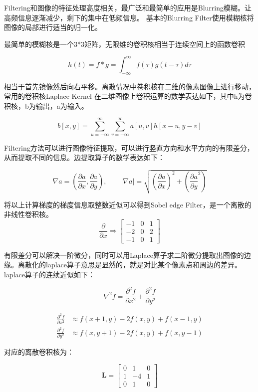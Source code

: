 Filtering和图像的特征处理高度相关，最广泛和最简单的应用是Blurring模糊。让高频信息逐渐减少，剩下的集中在低频信息。
基本的Blurring Filter使用模糊核将图像的局部进行适当的归一化。

最简单的模糊核是一个3*3矩阵，无限维的卷积核相当于连续空间上的函数卷积

\[
h(t) = f * g = \int_{-\infty}^{\infty} f(\tau)g(t - \tau) d\tau
\]

相当于首先镜像然后向右平移。离散情况中卷积核在二维的像素图像上进行移动，常用的卷积核Laplace Kernel
在二维图像上卷积运算的数学表达如下，其中h为卷积核，b为输出，a为输入。

\[
b[x, y] = \sum_{u = -\infty}^{\infty}\sum_{v = -\infty}^{\infty}a[u,v]h[x - u,y - v]  
\]

Filtering方法可以进行图像特征提取，可以进行竖直方向和水平方向的有限差分，从而提取不同的信息。边提取算子的数学表达如下：

\[
\nabla a  = (\frac{\partial a}{\partial x}, \frac{\partial a}{\partial y}) , \qquad |\nabla a| = \sqrt{(\frac{\partial a}{\partial x})^2 + (\frac{\partial a}{\partial y}^2)}
\]

将以上计算梯度的梯度信息取整数近似可以得到Sobel edge Filter，是一个离散的非线性卷积核。
\[
\frac{\partial}{\partial x} \Rightarrow
\begin{bmatrix}
    -1 & 0 & 1 \\
    -2 & 0 & 2 \\
    -1 & 0 & 1
\end{bmatrix}
\]

有限差分可以解决一阶微分，同时可以用Laplace算子求二阶微分提取出图像的边缘。离散化的laplace算子意思是显然的，就是对比某个像素点和周边的差异。
laplace算子的连续近似如下：

\[
\nabla^2 f = \frac{\partial^2 f}{\partial x^2} + \frac{\partial^2 f}{\partial y^2}
\]

\[
\begin{aligned}
\frac{\partial^2 f}{\partial x^2} &\approx f(x+1, y) - 2f(x, y) + f(x-1, y) \\
\frac{\partial^2 f}{\partial y^2} &\approx f(x, y+1) - 2f(x, y) + f(x, y-1)
\end{aligned}
\]

对应的离散卷积核为：

\[
\mathbf{L} = \begin{bmatrix}
    0 & 1 & 0 \\
    1 & -4 & 1 \\
    0 & 1 & 0
\end{bmatrix}
\]

